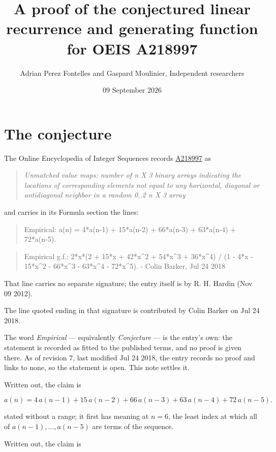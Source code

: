 \documentclass[11pt]{article}
\title{A proof of the conjectured linear recurrence and generating function for OEIS A218997}
\author{Adrian Perez Fontelles and Gaspard Moulinier, Independent researchers}
\date{09 September 2026}
\theoremstyle{definition}
\begin{document}
\maketitle
\section{The conjecture}

The Online Encyclopedia of Integer Sequences records \href{https://oeis.org/A218997}{A218997} as

\begin{quote}\itshape Unmatched value maps: number of n X 3 binary arrays indicating the locations of corresponding elements not equal to any horizontal, diagonal or antidiagonal neighbor in a random 0..2 n X 3 array\end{quote}

and carries in its Formula section the lines:

\begin{quote}\ttfamily Empirical: a(n) = 4*a(n-1) + 15*a(n-2) + 66*a(n-3) + 63*a(n-4) + 72*a(n-5).\end{quote}

\begin{quote}\ttfamily Empirical g.f.: 2*x*(2 + 15*x + 42*x\textasciicircum{}2 + 54*x\textasciicircum{}3 + 36*x\textasciicircum{}4) / (1 - 4*x - 15*x\textasciicircum{}2 - 66*x\textasciicircum{}3 - 63*x\textasciicircum{}4 - 72*x\textasciicircum{}5). - Colin Barker, Jul 24 2018\end{quote}

That line carries no separate signature; the entry itself is by R. H. Hardin (Nov 09 2012).

The line quoted ending in that signature is contributed by Colin Barker on Jul 24 2018.

The word {\itshape Empirical} --- equivalently {\itshape Conjecture} --- is the entry's own: the statement is recorded as fitted to the published terms, and no proof is given there. As of revision 7, last modified Jul 24 2018, the entry records no proof and links to none, so the statement is open. This note settles it.

Written out, the claim is

\[a(n) = 4\,a(n-1) + 15\,a(n-2) + 66\,a(n-3) + 63\,a(n-4) + 72\,a(n-5).\]

stated without a range; it first has meaning at $n = 6$, the least index at which all of $a(n-1),\dots,a(n-5)$ are terms of the sequence.

Written out, the claim is
\end{document}

